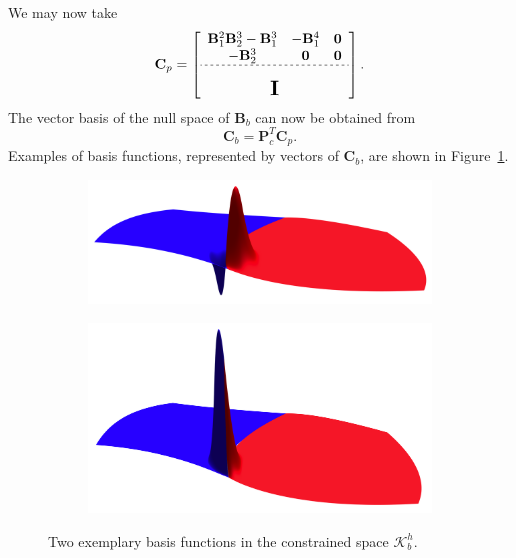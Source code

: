 We may now take
\begin{equation}
  \mathbf{C}_p=
  \left[\begin{array}{ccc}
      \mathbf{B}_1^2\mathbf{B}_2^3-\mathbf{B}_1^3 & -\mathbf{B}_1^4 & \mathbf{0}        \\
      -\mathbf{B}_2^3                             & \mathbf{0}      & \mathbf{0}        \\ \hdashline[2pt/2pt]
      \multicolumn{3}{c}{\multirow{3}{*}{\raisebox{0mm}{\scalebox{1.5}{$\mathbf{I}$}}}} \\
                                                  &                 &
    \end{array}\right].
\end{equation}
The vector basis of the null space of $\mathbf{B}_b$ can now be obtained from
\begin{equation}
  \mathbf{C}_b=\mathbf{P}_c^T\mathbf{C}_p.\label{eq:permuted_back_nullspace}
\end{equation}
Examples of basis functions, represented by vectors of $\mathbf{C}_b$, are shown in Figure~\ref{fig:constrained_basis}.
\begin{figure}[ht]
  \center
  \begin{subfigure}[b]{0.47\textwidth}
    \includegraphics[scale=.15]{constrained_basis2}
  \end{subfigure}
  \hfill
  \begin{subfigure}[b]{0.47\textwidth}
    \includegraphics[scale=.15]{constrained_basis1}
  \end{subfigure}
  \caption{Two exemplary basis functions in the constrained space $\mathcal{K}_b^h$.}
  \label{fig:constrained_basis}
\end{figure}

